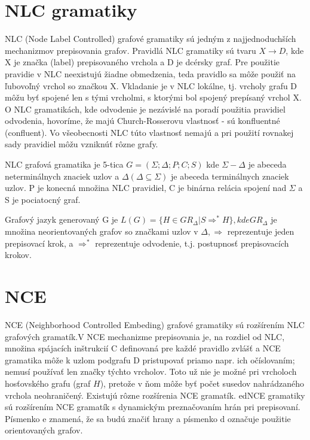 \section{NLC gramatiky}
NLC (Node Label Controlled) grafové gramatiky sú jedným 
z najjednoduchších mechanizmov prepisovania grafov. Pravidlá NLC gramatiky 
sú tvaru $X \to D$, kde X je značka (label) prepisovaného vrchola a D je 
dcérsky graf. Pre použitie pravidie v NLC neexistujú žiadne obmedzenia, teda 
pravidlo sa môže použiť na ľubovoľný vrchol so značkou X.
Vkladanie je v NLC lokálne, tj. vrcholy grafu D môžu byť spojené len s tými 
vrcholmi, s ktorými bol spojený prepísaný vrchol X.
O NLC gramatikách, kde odvodenie je nezávislé na poradí použitia pravidiel 
odvodenia, hovoríme, že majú Church-Rosserovu vlastnosť 
- sú konfluentné (confluent). 
Vo všeobecnosti NLC túto vlastnosť nemajú a pri použití rovnakej sady 
pravidiel môžu vzniknúť rôzne grafy. 

\begin{defin}
NLC grafová gramatika je 5-tica $G = (\Sigma ;\Delta ; P;C; S)$ kde
$\Sigma  - \Delta$  je abeceda neterminálnych znaciek uzlov a
 $\Delta  (\Delta  \subseteq  \Sigma )$ je abeceda
terminálnych znaciek uzlov. P je konecná množina NLC pravidiel, C je
binárna relácia spojení nad $\Sigma$  a S je pociatocný graf.
\end{defin}

\begin{defin}
Grafový jazyk generovaný G je $L(G) = \{H \in GR_\Delta  | S \Rightarrow ^*H\}
, kde GR_\Delta $  je množina neorientovaných grafov so značkami uzlov 
v $\Delta ,\Rightarrow $  reprezentuje jeden prepisovací krok, 
a $\Rightarrow ^* $ reprezentuje odvodenie, t.j. postupnosť prepisovacích 
krokov.
\end{defin}

\section{NCE}
NCE (Neighborhood Controlled Embeding) grafové gramatiky sú rozšírením NLC 
grafových gramatík.V NCE mechanizme prepisovania je, 
na rozdiel od NLC, množina spájacích inštrukcií C definovaná 
pre každé pravidlo zvlášť a NCE gramatika môže k uzlom podgrafu D 
pristupovať priamo napr. ich očíslovaním; nemusí používať len značky týchto
vrcholov. Toto už nie je možné pri vrcholoch hosťovského grafu (graf $H$),
pretože v ňom môže byť počet susedov nahrádzaného vrchola neohraničený.
Existujú rôzne rozšírenia NCE gramatík.
edNCE gramatiky sú rozšírením NCE gramatík s dynamickým 
preznačovaním hrán pri prepisovaní. 
Písmenko e znamená, že sa  budú značiť hrany a písmenko d označuje 
použitie orientovaných grafov.

